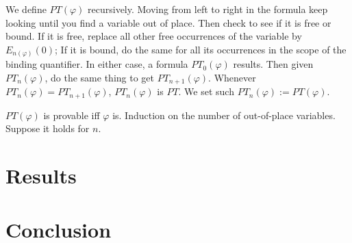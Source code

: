 \documentclass{article}
\begin{document}
We define $PT(\varphi)$ recursively. Moving from left to right in the formula 
keep looking until you find a variable out of place. Then check to see 
if it is free or bound. If it is free, replace all other free occurrences of the 
variable by $E_{n(\varphi)}(0)$; If 
it is bound, do the same for all its occurrences in the scope 
of the binding quantifier. In either case, a formula $PT_0(\varphi)$
results. Then given $PT_n(\varphi)$, do the same thing to get $PT_{n+1}(\varphi)$.
Whenever $PT_n(\varphi) = PT_{n+1}(\varphi)$, $PT_n(\varphi)$ is $PT$. We set 
such $PT_n(\varphi) := PT(\varphi)$.

$PT(\varphi)$ is provable iff $\varphi$ is. Induction on the number of out-of-place 
variables. Suppose it holds for $n$. 
\section{Results}
\section{Conclusion}
\end{document}
